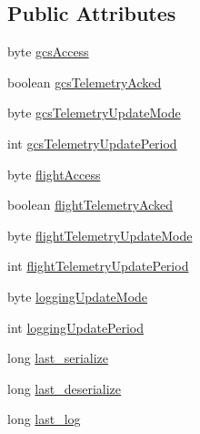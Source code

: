 \subsection*{\-Public \-Attributes}
\begin{DoxyCompactItemize}
\item 
byte \hyperlink{classorg_1_1taulabs_1_1uavtalk_1_1_u_a_v_object_meta_data_a2941c0abba1a1ceba72fca71ecbdca1c}{gcs\-Access}
\item 
boolean \hyperlink{classorg_1_1taulabs_1_1uavtalk_1_1_u_a_v_object_meta_data_a3e7b178024844d6ab88d0eb7642e84a4}{gcs\-Telemetry\-Acked}
\item 
byte \hyperlink{classorg_1_1taulabs_1_1uavtalk_1_1_u_a_v_object_meta_data_a0141392094af31b697827de7dee6af97}{gcs\-Telemetry\-Update\-Mode}
\item 
int \hyperlink{classorg_1_1taulabs_1_1uavtalk_1_1_u_a_v_object_meta_data_a4fb9255c270434ec1cd3bde6d042a275}{gcs\-Telemetry\-Update\-Period}
\item 
byte \hyperlink{classorg_1_1taulabs_1_1uavtalk_1_1_u_a_v_object_meta_data_a104f782db0d754525db7e731954b6173}{flight\-Access}
\item 
boolean \hyperlink{classorg_1_1taulabs_1_1uavtalk_1_1_u_a_v_object_meta_data_a72abc063861510645794bd8d05dffb2d}{flight\-Telemetry\-Acked}
\item 
byte \hyperlink{classorg_1_1taulabs_1_1uavtalk_1_1_u_a_v_object_meta_data_a0873393e1b78b1c17ab5687ed5d327f1}{flight\-Telemetry\-Update\-Mode}
\item 
int \hyperlink{classorg_1_1taulabs_1_1uavtalk_1_1_u_a_v_object_meta_data_a8e40a42c20d921bf723d01be5d241b2b}{flight\-Telemetry\-Update\-Period}
\item 
byte \hyperlink{classorg_1_1taulabs_1_1uavtalk_1_1_u_a_v_object_meta_data_a8373cce57bf517c987129d3076ab6e82}{logging\-Update\-Mode}
\item 
int \hyperlink{classorg_1_1taulabs_1_1uavtalk_1_1_u_a_v_object_meta_data_a3e91300ff7b066a11f80048b6ccde0b6}{logging\-Update\-Period}
\item 
long \hyperlink{classorg_1_1taulabs_1_1uavtalk_1_1_u_a_v_object_meta_data_aca6a6cb9ced59415960e2da5e1a565a4}{last\-\_\-serialize}
\item 
long \hyperlink{classorg_1_1taulabs_1_1uavtalk_1_1_u_a_v_object_meta_data_adc4c24f8aca8d96bfb38ee148fb8678d}{last\-\_\-deserialize}
\item 
long \hyperlink{classorg_1_1taulabs_1_1uavtalk_1_1_u_a_v_object_meta_data_a4a4cd39c7d3cf13105d9253d7e321185}{last\-\_\-log}

\end{DoxyCompactItemize}
